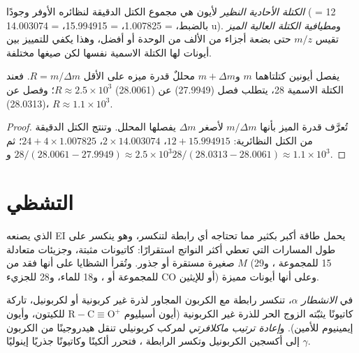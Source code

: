 \begin{definition}\label{def:b2:mass-spec-atomic:exact-mass}
\emph{الكتلة الأحادية النظير} لأيون هي مجموع الكتل الدقيقة لنظائره
الأوفر وجودًا ( = 12 بالضبط،  = 1.007825،  = 15.994915،
 = 14.003074 u). و\emph{مطيافية الكتلة العالية الميز}
تقيس $m/z$ حتى بضعة أجزاء من الألف من الوحدة أو أفضل، وهذا يكفي للتمييز بين أيونات لها الكتلة
الاسمية نفسها لكن صيغها مختلفة.
\end{definition}

\begin{proposition}\label{prop:b2:mass-spec-atomic:resolving}
يفصل أيونين كتلتاهما $m$ و$m + \Delta m$ محللٌ قدرة ميزه على الأقل
$R = m/\Delta m$. فعند الكتلة الاسمية 28، يتطلب فصل  (27.9949) عن  (28.0061) $R
\approx 2.5 \times 10^3$؛ وفصل  عن  (28.0313)، $R \approx 1.1 \times 10^3$.
\end{proposition}

\begin{proof}
تُعرَّف قدرة الميز بأنها $m/\Delta m$ لأصغر $\Delta m$ يفصلها المحلل. 
وتنتج الكتل الدقيقة من الكتل النظائرية: $12 + 15.994915$، $2 \times 14.003074$، $24 + 4 \times
1.007825$؛ ثم $28/(28.0061 - 27.9949) \approx 2.5 \times 10^3$ و$28/(28.0313 - 28.0061) \approx
1.1 \times 10^3$.
\end{proof}

\section{التشظي}

 الذي يصنعه EI يحمل طاقة أكبر بكثير مما تحتاجه أي رابطة لتنكسر، وهو ينكسر على طول
المسارات التي تعطي أكثر النواتج استقرارًا: كاتيونات مثبتة، وجزيئات متعادلة صغيرة مستقرة أو
جذور. وتُقرأ الشظايا على أنها فقد من $M$ (15 للمجموعة ، و29 للمجموعة  أو ، و18
للماء، و28 للجزيء CO أو للإيثين) وعلى أنها أيونات مميزة.

\begin{definition}[تشظيان]\label{def:b2:mass-spec-atomic:fragmentation}
في \emph{الانشطار $\alpha$}، تنكسر رابطة مع الكربون المجاور
لذرة غير كربونية أو لكربونيل، تاركة كاتيونًا يثبّته الزوج الحر للذرة غير الكربونية (أيون
أسيليوم $\mathrm{R{-}C{\equiv}O^+}$ للكيتون، وأيون إيمينيوم للأمين). و\emph{إعادة ترتيب
ماكلافرتي} لمركب كربونيلي تنقل هيدروجينًا من
الكربون $\gamma$ إلى أكسجين الكربونيل وتكسر الرابطة \babelsublr{$\alpha$--$\beta$}، فتحرر ألكينًا 
وكاتيونًا جذريًا إينوليًا.
\end{definition}

